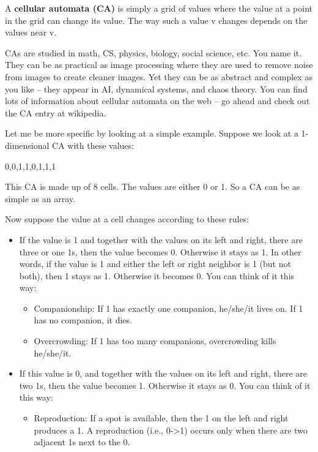 \documentclass[
]{article}
\providecommand{\tightlist}{%
  \setlength{\itemsep}{0pt}\setlength{\parskip}{0pt}}
\begin{document}
A \textbf{cellular automata (CA)} is simply a grid of values where the
value at a point in the grid can change its value. The way such a value
v changes depends on the values near v.

CAs are studied in math, CS, physics, biology, social science, etc. You
name it. They can be as practical as image processing where they are
used to remove noise from images to create cleaner images. Yet they can
be as abstract and complex as you like -- they appear in AI, dynamical
systems, and chaos theory. You can find lots of information about
cellular automata on the web -- go ahead and check out the CA entry at
wikipedia.

Let me be more specific by looking at a simple example. Suppose we look
at a 1-dimensional CA with these values:

0,0,1,1,0,1,1,1

This CA is made up of 8 cells. The values are either 0 or 1. So a CA can
be as simple as an array.

Now suppose the value at a cell changes according to these rules:

\begin{itemize}
\item
  If the value is 1 and together with the values on its left and right,
  there are three or one 1s, then the value becomes 0. Otherwise it
  stays as 1. In other words, if the value is 1 and either the left or
  right neighbor is 1 (but not both), then 1 stays as 1. Otherwise it
  becomes 0. You can think of it this way:

  \begin{itemize}
  \tightlist
  \item
    Companionship: If 1 has exactly one companion, he/she/it lives on.
    If 1 has no companion, it dies.
  \item
    Overcrowding: If 1 has too many companions, overcrowding kills
    he/she/it.
  \end{itemize}
\item
  If this value is 0, and together with the values on its left and
  right, there are two 1s, then the value becomes 1. Otherwise it stays
  as 0. You can think of it this way:

  \begin{itemize}
  \tightlist
  \item
    Reproduction: If a spot is available, then the 1 on the left and
    right produces a 1. A reproduction (i.e., 0-\textgreater1) occurs
    only when there are two adjacent 1s next to the 0.
  \end{itemize}
\end{itemize}
\end{document}

